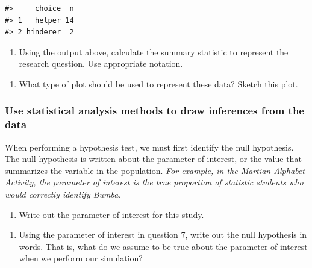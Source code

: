 \documentclass[
]{report}
\providecommand{\tightlist}{%
  \setlength{\itemsep}{0pt}\setlength{\parskip}{0pt}}
\begin{document}
\begin{verbatim}
#>     choice  n
#> 1   helper 14
#> 2 hinderer  2
\end{verbatim}

\begin{enumerate}
\def\labelenumi{\arabic{enumi}.}
\setcounter{enumi}{4}
\tightlist
\item
  Using the output above, calculate the summary statistic to represent the research question. Use appropriate notation.
\end{enumerate}

\vspace{0.5in}

\begin{enumerate}
\def\labelenumi{\arabic{enumi}.}
\setcounter{enumi}{5}
\tightlist
\item
  What type of plot should be used to represent these data? Sketch this plot.
\end{enumerate}

\vspace{1.5in}

\hypertarget{use-statistical-analysis-methods-to-draw-inferences-from-the-data}{%
\subsubsection*{Use statistical analysis methods to draw inferences from the data}\label{use-statistical-analysis-methods-to-draw-inferences-from-the-data}}

When performing a hypothesis test, we must first identify the null hypothesis. The null hypothesis is written about the parameter of interest, or the value that summarizes the variable in the population. \emph{For example, in the Martian Alphabet Activity, the parameter of interest is the true proportion of statistic students who would correctly identify Bumba.}

\begin{enumerate}
\def\labelenumi{\arabic{enumi}.}
\setcounter{enumi}{6}
\tightlist
\item
  Write out the parameter of interest for this study.
\end{enumerate}

\vspace{0.8in}

\begin{enumerate}
\def\labelenumi{\arabic{enumi}.}
\setcounter{enumi}{7}
\tightlist
\item
  Using the parameter of interest in question 7, write out the null hypothesis in words. That is, what do we assume to be true about the parameter of interest when we perform our simulation?
\end{enumerate}
\end{document}
